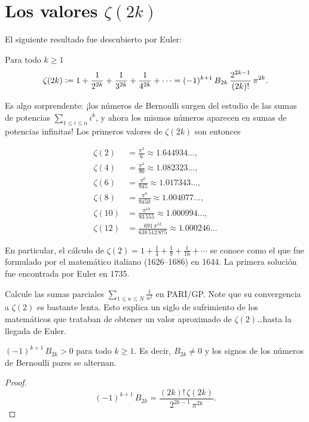 \documentclass{article}
\begin{document}

\section*{Los valores $\zeta (2k)$}

El siguiente resultado fue descubierto por Euler:

\begin{teorema*}
Para todo $k\ge 1$
$$\zeta (2k) \mathrel{\mathop:}= 1 + \frac{1}{2^{2k}} + \frac{1}{3^{2k}} + \frac{1}{4^{2k}} + \cdots = (-1)^{k+1} \, B_{2k}\,\frac{2^{2k-1}}{(2k)!}\,\pi^{2k}.$$
\end{teorema*}

Es algo sorprendente: ¡los números de Bernoulli surgen del estudio de las sumas de potencias $\sum_{1 \le i \le n} i^k$, y ahora los mismos números aparecen en sumas de potencias infinitas! Los primeros valores de $\zeta (2k)$ son entonces

\begin{align*}
\zeta (2) & = \frac{\pi^2}{6} \approx 1.644934\ldots, \\
\zeta (4) & = \frac{\pi^4}{90} \approx 1.082323\ldots, \\
\zeta (6) & = \frac{\pi^6}{945}  \approx 1.017343\ldots, \\
\zeta (8) & = \frac{\pi^8}{9450} \approx 1.004077\ldots, \\
\zeta (10) & = \frac{\pi^{10}}{93\,555} \approx 1.000994\ldots, \\
\zeta (12) & = \frac{691\,\pi^{12}}{638\,512\,875} \approx 1.000246\ldots
\end{align*}

En particular, el cálculo de $\zeta (2) = 1 + \frac{1}{4} + \frac{1}{9} + \frac{1}{16} + \cdots$ se conoce como el  que fue formulado por el matemático italiano  (1626--1686) en 1644. La primera solución fue encontrada por Euler en 1735.

\begin{ejercicio*}
Calcule las sumas parciales $\sum_{1 \le n \le N} \frac{1}{n^2}$ en PARI/GP. Note que su convergencia a $\zeta (2)$ es bastante lenta. Esto explica un siglo de sufrimiento de los matemáticos que trataban de obtener un valor aproximado de $\zeta (2)$\dots hasta la llegada de Euler.
\end{ejercicio*}

\begin{corolario*}
$(-1)^{k+1}\,B_{2k} > 0$ para todo $k \ge 1$. Es decir, $B_{2k} \ne 0$ y los signos de los números de Bernoulli pares se alternan.

\begin{proof}
$$(-1)^{k+1}\, B_{2k} = \frac{(2k)! \, \zeta (2k)}{2^{2k-1}\,\pi^{2k}}.$$
\end{proof}
\end{corolario*}
\end{document}
